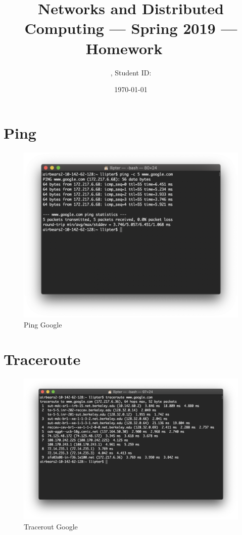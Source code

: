 \documentclass[11pt]{article}
\title{\Large Networks and Distributed Computing --- Spring 2019 --- Homework \Homework\ }
\author{\Name, Student ID: \SID}
\date{\today}
\begin{document}
\maketitle

\section{Ping}

\begin{figure}[h]
\centering
\includegraphics[width=1\textwidth]{ping.png}
\caption{\label{fig:ping}Ping Google}
\end{figure}

\newpage
\section{Traceroute}

\begin{figure}[h]
\centering
\includegraphics[width=1\textwidth]{traceroute.png}
\caption{\label{fig:traceroute}Tracerout Google}
\end{figure}
\end{document}
